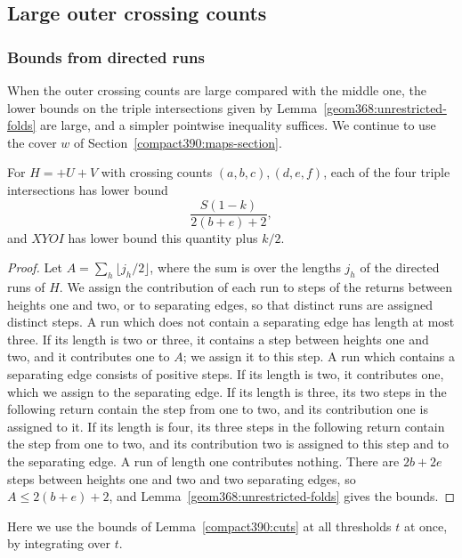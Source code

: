 \subsection{Large outer crossing counts}
\subsubsection{Bounds from directed runs}
\label{compact390:bulk-section}
When the outer crossing counts are large compared with the middle one, the lower bounds on the triple intersections given by Lemma~\ref{geom368:unrestricted-folds} are large, and a simpler pointwise inequality suffices.
We continue to use the cover $w$ of Section~\ref{compact390:maps-section}.


\begin{corollary}
\label{geom368:canonical-fold-budget}
For $H=+U+V$ with crossing counts $(a,b,c),(d,e,f)$,
each of the four triple intersections has lower bound
\[
                         \frac{S(1-k)}{2(b+e)+2},
\]
and $XYOI$ has lower bound this quantity plus $k/2$.
\end{corollary}
\begin{proof}
Let $A=\sum_h\lfloor j_h/2\rfloor$, where the sum is over the lengths $j_h$ of the directed runs of $H$. We assign the contribution of each run to steps of the returns between heights one and two, or to separating edges, so that distinct runs are assigned distinct steps. A run which does not
contain a separating edge has length at most three. If its
length is two or three, it contains a step between heights one and two, and it contributes one to $A$; we assign it to this step.
A run which contains a separating edge consists of positive steps. If its length is
two, it contributes one, which we assign to the separating edge. If its
length is three, its two steps in the following return contain the step from one to two, and its contribution one is assigned
to it. If its length is four, its three steps in the following return contain the step from one to two, and its contribution two is assigned
to this step and to the separating edge. A run of length one contributes nothing.
There are $2b+2e$ steps between heights one and two and two separating edges,
so $A\le2(b+e)+2$, and Lemma~\ref{geom368:unrestricted-folds} gives the bounds.
\end{proof}

Here we use the bounds of Lemma~\ref{compact390:cuts} at all thresholds $t$ at once, by integrating over $t$.

